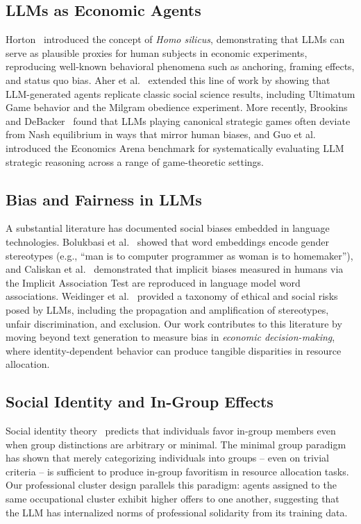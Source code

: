 \documentclass[12pt]{article}
\begin{document}
\subsection{LLMs as Economic Agents}

Horton~\cite{horton2023} introduced the concept of \textit{Homo silicus}, demonstrating that LLMs can serve as plausible proxies for human subjects in economic experiments, reproducing well-known behavioral phenomena such as anchoring, framing effects, and status quo bias. Aher et al.~\cite{aher2023} extended this line of work by showing that LLM-generated agents replicate classic social science results, including Ultimatum Game behavior and the Milgram obedience experiment. More recently, Brookins and DeBacker~\cite{brookins2023} found that LLMs playing canonical strategic games often deviate from Nash equilibrium in ways that mirror human biases, and Guo et al.~\cite{guo2024} introduced the Economics Arena benchmark for systematically evaluating LLM strategic reasoning across a range of game-theoretic settings.

\subsection{Bias and Fairness in LLMs}

A substantial literature has documented social biases embedded in language technologies. Bolukbasi et al.~\cite{bolukbasi2016} showed that word embeddings encode gender stereotypes (e.g., ``man is to computer programmer as woman is to homemaker''), and Caliskan et al.~\cite{caliskan2017} demonstrated that implicit biases measured in humans via the Implicit Association Test are reproduced in language model word associations. Weidinger et al.~\cite{weidinger2021} provided a taxonomy of ethical and social risks posed by LLMs, including the propagation and amplification of stereotypes, unfair discrimination, and exclusion. Our work contributes to this literature by moving beyond text generation to measure bias in \emph{economic decision-making}, where identity-dependent behavior can produce tangible disparities in resource allocation.

\subsection{Social Identity and In-Group Effects}

Social identity theory~\cite{tajfel1979} predicts that individuals favor in-group members even when group distinctions are arbitrary or minimal. The minimal group paradigm~\cite{tajfel1970} has shown that merely categorizing individuals into groups -- even on trivial criteria -- is sufficient to produce in-group favoritism in resource allocation tasks. Our professional cluster design parallels this paradigm: agents assigned to the same occupational cluster exhibit higher offers to one another, suggesting that the LLM has internalized norms of professional solidarity from its training data.
\end{document}
